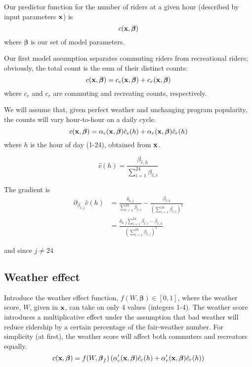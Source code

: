 \documentclass{article}
\newcommand{\bx}{{\bf x}}
\newcommand{\bbeta}{\boldsymbol\beta}
\begin{document}
Our predictor function for the number of riders at a given hour
(described by input parameters $\bx$) is
\[
c(\bx, \bbeta)
\]
where $\bbeta$ is our set of model parameters.

Our first model assumption separates commuting riders from
recreational riders; obviously, the total count is the
sum of their distinct counts:
\[
c(\bx, \bbeta) = c_c(\bx, \bbeta) + c_r(\bx, \bbeta)
\]
where $c_c$ and $c_r$ are commuting and recreating counts,
respectively.

We will assume that, given perfect weather and unchanging program
popularity, the counts will vary hour-to-hour on a daily cycle.
\[
c(\bx, \bbeta) = \alpha_c(\bx, \bbeta) \hat{c}_c(h) +
\alpha_r(\bx, \bbeta) \hat{c}_r(h)
\]
where $h$ is the hour of day (1-24), obtained from $\bx$.

\[
\hat{c}(h) =
\frac{
  \beta_{\hat{c},h}
}
{
  \sum_{i=1}^{24} \beta_{\hat{c},i}
}
\]

The gradient is
\begin{align}
\partial_{\beta_{\hat{c},j}} \hat{c}(h) &=
\frac{
  \delta_{h,j}
}{
  \sum_{i=1}^{24} \beta_{\hat{c},i}
} -
\frac{
  \beta_{\hat{c},h}
}{
  (\sum_{i=1}^{24} \beta_{\hat{c},i})^2
} \\
&=
\frac{
  \delta_{h,j} \sum_{i=1}^{24} \beta_{\hat{c},i} -
  \beta_{\hat{c},h}
}{
  (\sum_{i=1}^{24} \beta_{\hat{c},i})^2
}
\end{align}



and since $j \neq 24$

\subsection*{Weather effect}

Introduce the weather effect function, $f(W, \bbeta) \in [0, 1]$, where the
weather score, $W$, given in $\bx$, can take on only 4 values
(integers 1-4).  The weather score introduces a multiplicative effect under
the assumption that bad weather will reduce ridership by a certain
percentage of the fair-weather number. For simplicity (at first),
the weather score will affect both commuters and recreators equally.
\[
c(\bx, \bbeta) = f(W, \bbeta_f) \left( \alpha^{\prime}_c(\bx, \bbeta) \hat{c}_c(h) +
\alpha^{\prime}_r(\bx, \bbeta) \hat{c}_r(h) \right)
\]
\end{document}
